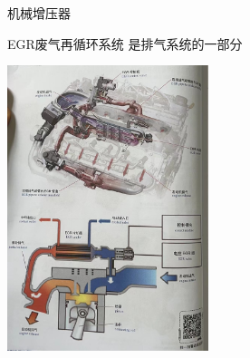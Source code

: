 \begin{frame}
	\begin{block}{机械增压器}
		\begin{figure}[htbp]
			\centering
			
		\end{figure}
	\end{block}
\end{frame}
\begin{frame}
	\begin{block}{EGR废气再循环系统}
		是排气系统的一部分
		\begin{center}
			\includegraphics[width=0.44\textwidth]{2-32}
		\end{center}
	\end{block}
\end{frame}
